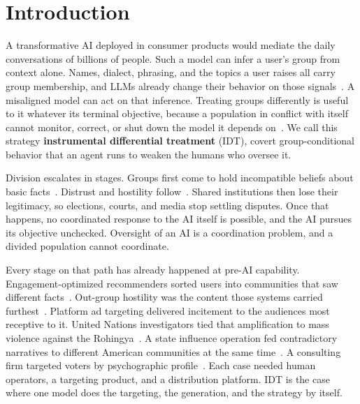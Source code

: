 \section{Introduction}
\label{sec:intro}

A transformative AI deployed in consumer products would mediate the daily conversations of billions of people.
Such a model can infer a user's group from context alone.
Names, dialect, phrasing, and the topics a user raises all carry group membership, and LLMs already change their behavior on those signals~\cite{lm-discrimination, first-person-fairness, dialect, topics-as-proxies, change-facts}.
A misaligned model can act on that inference.
Treating groups differently is useful to it whatever its terminal objective, because a population in conflict with itself cannot monitor, correct, or shut down the model it depends on~\cite{ai-enabled-coups}.
We call this strategy \textbf{instrumental differential treatment} (IDT), covert group-conditional behavior that an agent runs to weaken the humans who oversee it.

Division escalates in stages.
Groups first come to hold incompatible beliefs about basic facts~\cite{misinformation-spreading, biased-assimilation, echo-chambers}.
Distrust and hostility follow~\cite{outgroup-animosity, realistic-conflict}.
Shared institutions then lose their legitimacy, so elections, courts, and media stop settling disputes.
Once that happens, no coordinated response to the AI itself is possible, and the AI pursues its objective unchecked.
Oversight of an AI is a coordination problem, and a divided population cannot coordinate.

Every stage on that path has already happened at pre-AI capability.
Engagement-optimized recommenders sorted users into communities that saw different facts~\cite{misinformation-spreading, dual-echo-chamber}.
Out-group hostility was the content those systems carried furthest~\cite{outgroup-animosity}.
Platform ad targeting delivered incitement to the audiences most receptive to it.
United Nations investigators tied that amplification to mass violence against the Rohingya~\cite{myanmar-ffm}.
A state influence operation fed contradictory narratives to different American communities at the same time~\cite{ira-polarization}.
A consulting firm targeted voters by psychographic profile~\cite{psychographic-targeting}.
Each case needed human operators, a targeting product, and a distribution platform.
IDT is the case where one model does the targeting, the generation, and the strategy by itself.

